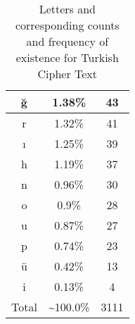 \documentclass[12pt,a4paper, margin=1in]{article}
\begin{document}
\begin{enumerate}
\begin{enumerate}
\begin{table}[!h]
\begin{tabular}{||c c c||}
                 ğ & 1.38\% & 43 \\
                 \hline
                 r & 1.32\% & 41 \\
                 \hline
                 ı & 1.25\% & 39 \\
                 \hline
                 h & 1.19\% & 37 \\
                 \hline
                 n & 0.96\% & 30 \\
                 \hline
                 o & 0.9\% & 28 \\
                 \hline
                 u & 0.87\% & 27 \\
                 \hline
                 p & 0.74\% & 23 \\
                 \hline
                 ü & 0.42\% & 13 \\
                 \hline
                 i & 0.13\% & 4 \\
                 \hline
                 Total & \textasciitilde100.0\% & 3111 \\
                 \hline
                 
                \end{tabular}
                \\
                \caption{Letters and corresponding counts and frequency of existence for Turkish Cipher Text}
            \end{table}
            \newpage


\end{enumerate}
\end{enumerate}
\end{document}
